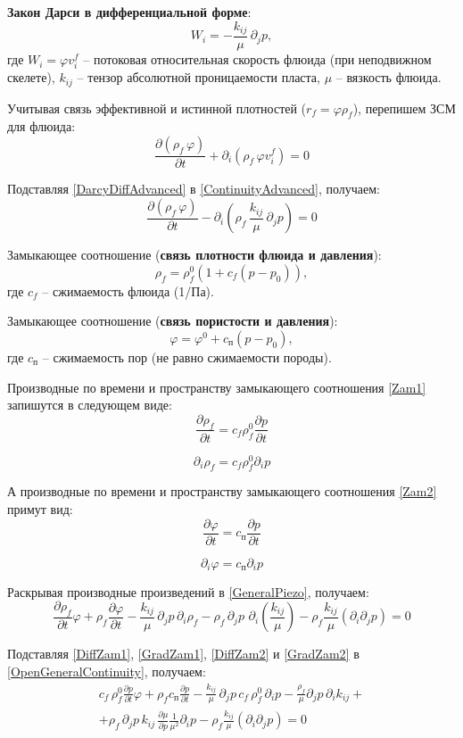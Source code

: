 \documentclass[a4paper,14pt]{extarticle}
\newcommand{\beq}{\begin{equation}}
\newcommand{\eeq}{\end{equation}}
\begin{document}
\textbf{Закон Дарси в дифференциальной форме}:
\beq\label{DarcyDiffAdvanced}
W_i=-\frac{k_{ij}}{\mu}\,\partial_{\!j}p,
\eeq
где $W_i=\varphi v_i^f$ -- потоковая относительная скорость флюида (при неподвижном скелете), $k_{ij}$ -- тензор абсолютной проницаемости пласта, $\mu$ -- вязкость флюида.

Учитывая связь эффективной и истинной плотностей ($r_{\!f}=\varphi\rho_{\!f}$), перепишем ЗСМ для флюида:
\beq\label{ContinuityAdvanced}
\frac{\partial\!\left(\rho_{\!f}\,\varphi\right)}{\partial t}+\partial_i\!\left(\rho_{\!f}\,\varphi v_i^f\right)=0
\eeq

Подставляя \eqref{DarcyDiffAdvanced} в \eqref{ContinuityAdvanced}, получаем:
\beq\label{GeneralPiezo}
\frac{\partial\!\left(\rho_{\!f}\,\varphi\right)}{\partial t}-\partial_i\!\left(\rho_{\!f}\,\frac{k_{ij}}{\mu}\,\partial_{\!j} p\right)=0
\eeq


Замыкающее соотношение (\textbf{связь плотности флюида и давления}):
\beq\label{Zam1}
\rho_{\!f}=\rho_{\!f}^0\left(1+c_{\!f}\left(p-p_0\right)\right),
\eeq
где $c_{\!f}$ -- сжимаемость флюида (1/Па).


Замыкающее соотношение (\textbf{связь пористости и давления}):
\beq\label{Zam2}
\varphi=\varphi^0+c_{\text{п}}\left(p-p_0\right),
\eeq
где $c_{\text{п}}$ -- сжимаемость пор (не равно сжимаемости породы).


Производные по времени и пространству замыкающего соотношения \eqref{Zam1} запишутся в следующем виде:
\beq\label{DiffZam1}
\frac{\partial\rho_{\!f}}{\partial t}=c_f\rho_{\!f}^0\frac{\partial p}{\partial t}
\eeq

\beq\label{GradZam1}
\partial_i\rho_{\!f}=c_f\rho_{\!f}^0\partial_i p
\eeq

А производные по времени и пространству замыкающего соотношения \eqref{Zam2} примут вид:
\beq\label{DiffZam2}
\frac{\partial\varphi}{\partial t}=c_\text{п}\frac{\partial p}{\partial t}
\eeq

\beq\label{GradZam2}
\partial_i\varphi=c_\text{п}\partial_i p
\eeq


Раскрывая производные произведений в \eqref{GeneralPiezo}, получаем:
\beq\label{OpenGeneralContinuity}
\frac{\partial\rho_{\!f}}{\partial t}\varphi+\rho_{\!f}\frac{\partial\varphi}{\partial t}-\frac{k_{ij}}{\mu}\,\partial_{\!j} p\,\partial_i\rho_f-\rho_{\!f}\,\partial_{\!j} p\,\,\partial_i\!\!\left(\frac{k_{ij}}{\mu}\right)-\rho_{\!f}\frac{k_{ij}}{\mu}\left(\partial_i\partial_{\!j} p\right)=0
\eeq

Подставляя \eqref{DiffZam1}, \eqref{GradZam1}, \eqref{DiffZam2} и \eqref{GradZam2} в \eqref{OpenGeneralContinuity}, получаем:
\begin{multline}\label{Expanded}
c_{\!f}\,\rho_{\!f}^0\frac{\partial p}{\partial t}\varphi+\rho_{\!f} c_\text{п}\frac{\partial p}{\partial t}-\frac{k_{ij}}{\mu}\,\partial_{\!j} p\,c_{\!f}\,\rho_{\!f}^0\,\partial_i p-\frac{\rho_{\!f}}{\mu}\partial_{\!j} p\,\partial_i k_{ij}+\\+\rho_{\!f}\,\partial_{\!j} p\,k_{ij}\,\frac{\partial\mu}{\partial p}\frac{1}{\mu^2}\partial_i p-\rho_{\!f}\frac{k_{ij}}{\mu}\!\left(\partial_i\partial_{\!j} p\right)=0
\end{multline}
\end{document}
